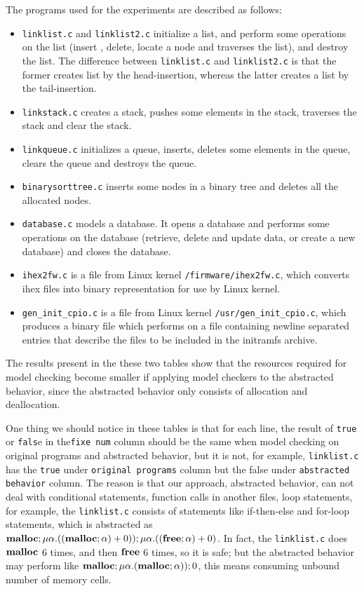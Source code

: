The programs used for the experiments are described as follows:
\begin{itemize}
\item \texttt{linklist.c} and \texttt{linklist2.c} initialize a list,
  and perform some operations on the list (insert , delete, locate a
  node and traverses the list), and destroy the list. The difference
  between \texttt{linklist.c} and \texttt{linklist2.c} is that the
  former creates list by the head-insertion, whereas the latter creates a list
  by the tail-insertion.
\item \texttt{linkstack.c} creates a stack, pushes some elements in
  the stack, traverses the stack and clear the stack.
\item \texttt{linkqueue.c} initializes a queue, inserts, deletes some
  elements in the queue, clears the queue and destroys the queue.
\item \texttt{binarysorttree.c} inserts some nodes in a binary tree
  and deletes all the allocated nodes.
\item \texttt{database.c} models a database. It opens a database and
  performs some operations on the database (retrieve, delete and
  update data, or create a new database) and closes the database.
\item \texttt{ihex2fw.c} is a file from Linux kernel
  \texttt{/firmware/ihex2fw.c}, which converts ihex files into binary
  representation for use by Linux kernel.
\item \texttt{gen\_init\_cpio.c} is a file from Linux kernel
  \texttt{/usr/gen\_init\_cpio.c}, which produces a binary file which
  performs on a file containing newline separated entries that
  describe the files to be included in the initramfs archive.
\end{itemize}

The results present in the these two tables show that the
resources required for model checking become smaller if applying model
checkers to the abstracted behavior, since the abstracted behavior
only consists of allocation and deallocation.

One thing we should notice in these tables is that for
each line, the result of \texttt{true} or \texttt{fals}e in
the\texttt{fixe num} column should be the same when model checking on
original programs and abstracted behavior, but it is not, for example,
\texttt{linklist.c} has the \texttt{true} under \texttt{original
  programs} column but the false under \texttt{abstracted behavior}
column. The reason is that our approach, abstracted behavior, can not
deal with conditional statements, function calls in another files,
loop statements, for example, the \texttt{linklist.c} consists of
statements like if-then-else and for-loop statements, which is
abstracted as $\mathbf{malloc};\mu\alpha.((\mathbf{malloc};\alpha) +
0));\mu\alpha.((\mathbf{free};\alpha) + 0)$. In fact, the \texttt{linklist.c}
does $\mathbf{malloc}$ 6 times, and then $\mathbf{free}$ 6 times, so it is safe; but
the abstracted behavior may perform like
$\mathbf{malloc};\mu\alpha.(\mathbf{malloc};\alpha));0$, this means consuming unbound
number of memory cells.

